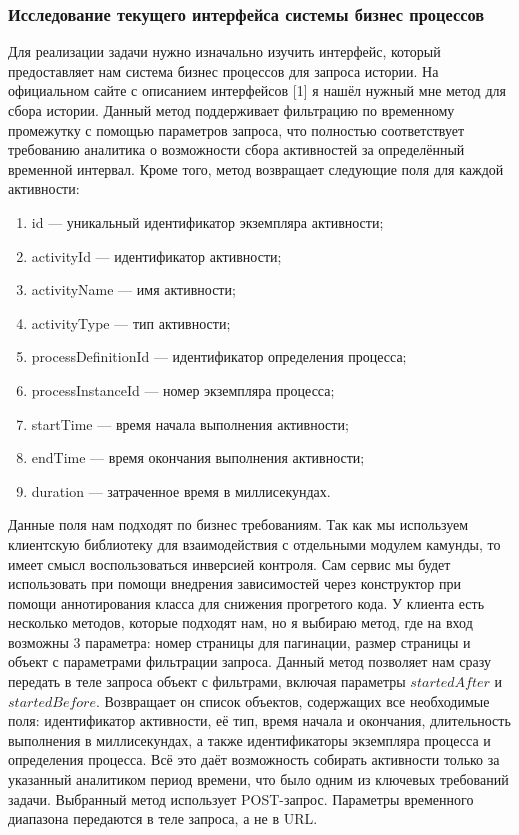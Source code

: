 \subsubsection{Исследование текущего интерфейса системы бизнес процессов}
Для реализации задачи нужно изначально изучить интерфейс, 
который предоставляет нам система бизнес процессов для запроса истории. На официальном сайте с описанием интерфейсов [1] я нашёл нужный мне метод для сбора истории. 
Данный метод поддерживает фильтрацию по временному промежутку с помощью параметров запроса, 
что полностью соответствует требованию аналитика о возможности сбора активностей за определённый временной интервал. 
Кроме того, метод возвращает следующие поля для каждой активности:
\begin{enumerate}
  \item id — уникальный идентификатор экземпляра активности;
  \item activityId — идентификатор активности;
  \item activityName — имя активности;
  \item activityType — тип активности;
  \item processDefinitionId — идентификатор определения процесса;
  \item processInstanceId — номер экземпляра процесса;
  \item startTime — время начала выполнения активности;
  \item endTime — время окончания выполнения активности;
  \item duration — затраченное время в миллисекундах.
\end{enumerate}
Данные поля нам подходят по бизнес требованиям. Так как мы используем клиентскую библиотеку для взаимодействия с отдельными модулем камунды, то имеет смысл воспользоваться инверсией контроля.
Сам сервис мы будет использовать при помощи внедрения зависимостей через конструктор при помощи аннотирования класса для снижения прогретого кода. У клиента есть несколько методов, которые подходят нам, но я выбираю метод, где на вход возможны 3 параметра: номер страницы для пагинации, размер страницы и объект с параметрами фильтрации запроса.
Данный метод позволяет нам сразу передать в теле запроса объект с фильтрами, включая параметры $startedAfter$ и $startedBefore$. Возвращает он список объектов, содержащих все необходимые поля: идентификатор активности, её тип, время начала и окончания, длительность выполнения в миллисекундах, а также идентификаторы экземпляра процесса и определения процесса. 
Всё это даёт возможность собирать активности только за указанный аналитиком период времени, что было одним из ключевых требований задачи.
Выбранный метод использует POST-запрос. Параметры временного диапазона передаются в теле запроса, а не в URL.

